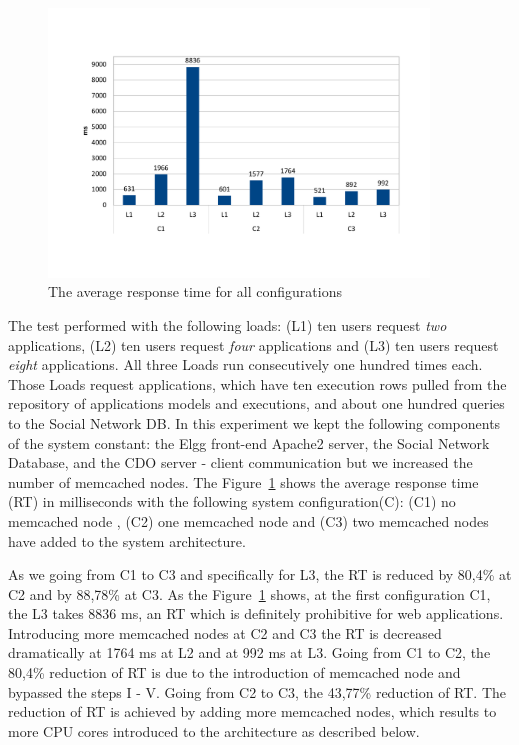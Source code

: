 \begin{figure}[h]
	\centering
	\includegraphics[width=0.9\textwidth,natwidth=200,natheight=150]{./fig/RTavg.pdf}
	\caption{The average response time for all configurations}
	\label{fig:rtavg}
\end{figure}

The test performed with the following loads: (L1) ten users request \emph{two} applications, (L2) ten users request \emph{four} applications and (L3) ten users request \emph{eight} applications. All three Loads run consecutively one hundred times each. Those Loads request applications, which have ten execution rows pulled from the repository of applications models and executions, and about one hundred queries to the Social Network DB. In this experiment we kept the following components of the system constant: the Elgg front-end Apache2 server, the Social Network Database, and the CDO server - client communication but we increased the number of memcached nodes.
The Figure~\ref{fig:rtavg} shows the  average response time (RT) in milliseconds with the following system configuration(C): (C1) no memcached node , (C2) one memcached node and (C3) two memcached nodes have added to the system architecture.

As we going from C1 to C3 and specifically for L3, the RT is reduced by 80,4\% at C2 and by 88,78\% at C3. As the Figure~\ref{fig:rtavg} shows, at the first configuration C1, the L3 takes 8836 ms, an RT which is definitely prohibitive for web applications. Introducing more memcached nodes at C2 and C3 the RT is decreased dramatically at 1764 ms at L2 and at 992 ms at L3. Going from C1 to C2, the 80,4\% reduction of RT is due to the introduction of memcached node and bypassed the steps I - V. Going from C2 to C3, the 43,77\% reduction of RT. The reduction of RT is achieved by adding more memcached nodes, which results to more CPU cores introduced to the architecture as described below.

